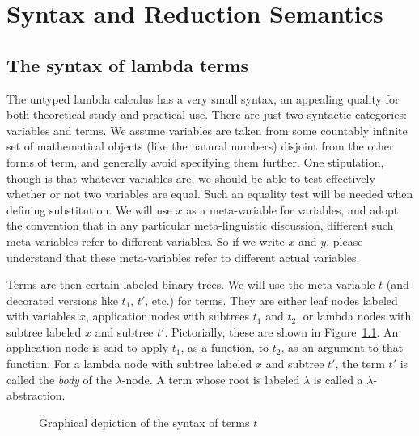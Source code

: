 \chapter{Syntax and Reduction Semantics}

\section{The syntax of lambda terms}
\label{sec:synlam}

The untyped lambda calculus has a very small syntax, an appealing
quality for both theoretical study and practical use.  There are just
two syntactic categories: variables and terms.  We assume variables
are taken from some countably infinite set of mathematical objects
(like the natural numbers) disjoint from the other forms of term, and
generally avoid specifying them further.  One stipulation, though is
that whatever variables are, we should be able to test effectively
whether or not two variables are equal.  Such an equality test will be
needed when defining substitution.  We will use $x$ as a meta-variable
for variables, and adopt the convention that in any particular
meta-linguistic discussion, different such meta-variables refer to
different variables.  So if we write $x$ and $y$, please understand
that these meta-variables refer to different actual variables.

Terms are then certain labeled binary trees.  We will use the
meta-variable $t$ (and decorated versions like $t_1$, $t'$, etc.) for
terms.  They are either leaf nodes labeled with variables $x$,
application nodes with subtrees $t_1$ and $t_2$, or lambda nodes with
subtree labeled $x$ and subtree $t'$.  Pictorially, these are shown in
Figure~\ref{fig:lamtrees}.  An application node is said to apply
$t_1$, as a function, to $t_2$, as an argument to that function.  For
a lambda node with subtree labeled $x$ and subtree $t'$, the term $t'$
is called the \emph{body} of the $\lambda$-node.  A term whose root is
labeled $\lambda$ is called a $\lambda$-abstraction.  

\begin{figure}
\begin{center}
\large
{}
\end{center}
\caption{Graphical depiction of the syntax of terms $t$}
\label{fig:lamtrees}
\end{figure}

